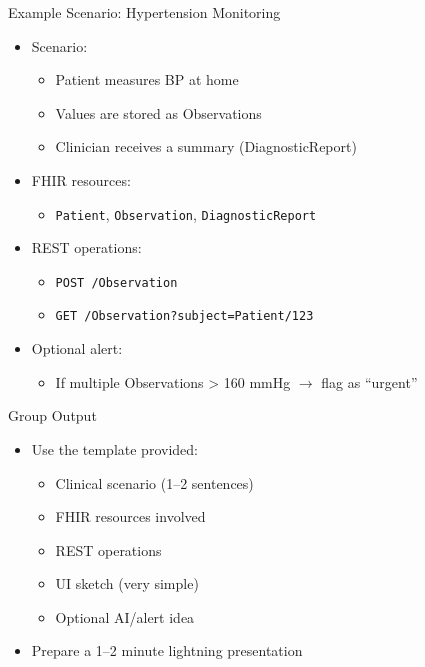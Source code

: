 \documentclass[aspectratio=1610]{beamer}
\begin{document}
	\begin{frame}{Example Scenario: Hypertension Monitoring}
		\begin{itemize}
			\item Scenario:
			\begin{itemize}
				\item Patient measures BP at home
				\item Values are stored as Observations
				\item Clinician receives a summary (DiagnosticReport)
			\end{itemize}
			\item FHIR resources:
			\begin{itemize}
				\item \texttt{Patient}, \texttt{Observation}, \texttt{DiagnosticReport}
			\end{itemize}
			\item REST operations:
			\begin{itemize}
				\item \texttt{POST /Observation}
				\item \texttt{GET /Observation?subject=Patient/123}
			\end{itemize}
			\item Optional alert:
			\begin{itemize}
				\item If multiple Observations > 160 mmHg $\rightarrow$ flag as ``urgent''
			\end{itemize}
		\end{itemize}
	\end{frame}
	
	\begin{frame}{Group Output}
		\begin{itemize}
			\item Use the template provided:
			\begin{itemize}
				\item Clinical scenario (1--2 sentences)
				\item FHIR resources involved
				\item REST operations
				\item UI sketch (very simple)
				\item Optional AI/alert idea
			\end{itemize}
			\item Prepare a 1--2 minute lightning presentation
		\end{itemize}
	\end{frame}
	
\end{document}
